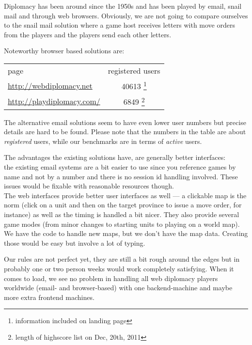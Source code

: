 \documentclass[11pt,a4paper]{report}
\begin{document}

Diplomacy has been around since the 1950s and has been played by email, snail
mail and through web browsers. Obviously, we are not going to compare ourselves
to the snail mail solution where a game host receives letters with move orders
from the players and the players send each other letters.

Noteworthy browser based solutions are:\\
\begin{tabular}{lc}
  page                           & registered users    \\
\url{http://webdiplomacy.net}    & 40613
\footnote{information included on landing page} \\
 \url{http://playdiplomacy.com/} & 6849
\footnote{length of highscore list on Dec, 20th, 2011}
\end{tabular}

The alternative email solutions seem to have even lower user numbers but precise
details are hard to be found. Please note that the numbers in
the table are about {\em registered\/} users, while our benchmarks are in terms
of {\em active\/} users.

The advantages the existing solutions have, are generally better interfaces: \\
the existing email systems are a bit easier to use since you reference games by
name and not by a number and there is no session id handling involved.
These issues would be fixable with reasonable resources though. \\
The web interfaces provide better user interfaces as well --- a clickable map
is the norm (click on a unit and then on the target province to issue a move
order, for instance) as well as the timing is handled a bit nicer. They also
provide several game modes (from minor changes to starting units to playing on
a world map). We have the code to handle new maps, but we don't have the map
data. Creating those would be easy but involve a lot of typing.

Our rules are not perfect yet, they are still a bit rough around the edges but
in probably one or two person weeks would work completely satisfying.
When it comes to load, we see no problem in handling all web diplomacy
players worldwide (email- and browser-based) with one backend-machine and maybe more extra frontend machines.
\end{document}

